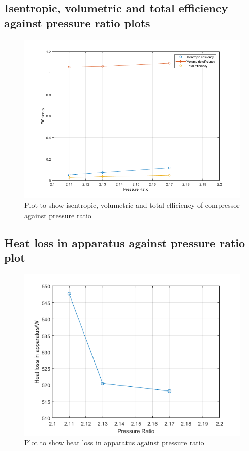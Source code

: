 \documentclass[class=article, crop=false, 12pt,a4paper]{standalone}
\numberwithin{equation}{section}
\begin{document}
\subsection{Isentropic, volumetric and total efficiency against pressure ratio plots}
\begin{figure}
  \centering
  \includegraphics[width = \textwidth]{./img/efficiencies}
  \caption{Plot to show isentropic, volumetric and total efficiency of compressor against pressure ratio}
\end{figure}
\subsection{Heat loss in apparatus against pressure ratio plot}
\begin{figure}
  \centering
  \includegraphics[width = \textwidth]{./img/heatLoss}
  \caption{Plot to show heat loss in apparatus against pressure ratio}
\end{figure}
\end{document}
